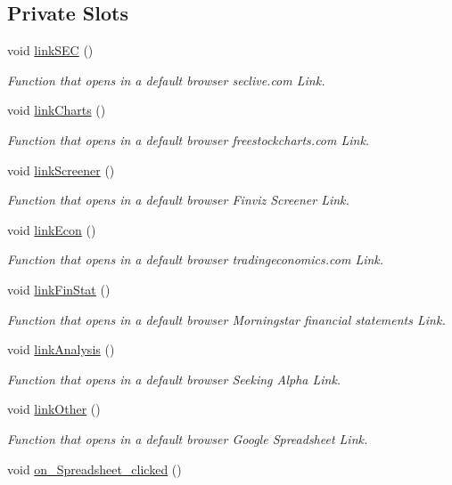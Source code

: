 \subsection*{Private Slots}
\begin{DoxyCompactItemize}
\item 
void \hyperlink{class_t_k_r_t_a_p_a0fd918db6da7ef497b167f3af9a21204}{link\+S\+E\+C} ()
\begin{DoxyCompactList}\small\item\em Function that opens in a default browser seclive.\+com Link. \end{DoxyCompactList}\item 
void \hyperlink{class_t_k_r_t_a_p_a5f1ebaf5fe11868b7aa882f2c734e4b2}{link\+Charts} ()
\begin{DoxyCompactList}\small\item\em Function that opens in a default browser freestockcharts.\+com Link. \end{DoxyCompactList}\item 
void \hyperlink{class_t_k_r_t_a_p_acefe694e3e0bf827a51817eaaca3e0da}{link\+Screener} ()
\begin{DoxyCompactList}\small\item\em Function that opens in a default browser Finviz Screener Link. \end{DoxyCompactList}\item 
void \hyperlink{class_t_k_r_t_a_p_aeb83e283359840bee97909a92564e324}{link\+Econ} ()
\begin{DoxyCompactList}\small\item\em Function that opens in a default browser tradingeconomics.\+com Link. \end{DoxyCompactList}\item 
void \hyperlink{class_t_k_r_t_a_p_aa0d9e2c05ad6640909eca54f995b04e7}{link\+Fin\+Stat} ()
\begin{DoxyCompactList}\small\item\em Function that opens in a default browser Morningstar financial statements Link. \end{DoxyCompactList}\item 
void \hyperlink{class_t_k_r_t_a_p_a74b55a81eb15e9eee97e901598be20eb}{link\+Analysis} ()
\begin{DoxyCompactList}\small\item\em Function that opens in a default browser Seeking Alpha Link. \end{DoxyCompactList}\item 
void \hyperlink{class_t_k_r_t_a_p_a118fbdc56d14b61c21ee360fb178b393}{link\+Other} ()
\begin{DoxyCompactList}\small\item\em Function that opens in a default browser Google Spreadsheet Link. \end{DoxyCompactList}\item 
\hypertarget{class_t_k_r_t_a_p_a5019b726b6b221933abc42259996a999}{void \hyperlink{class_t_k_r_t_a_p_a5019b726b6b221933abc42259996a999}{on\+\_\+\+Spreadsheet\+\_\+clicked} ()}\label{class_t_k_r_t_a_p_a5019b726b6b221933abc42259996a999}


\end{DoxyCompactItemize}

